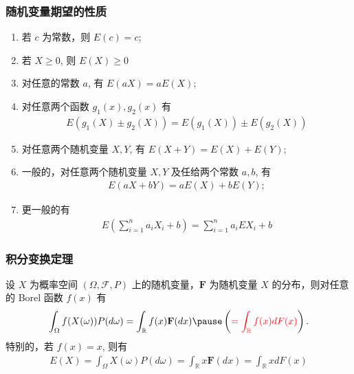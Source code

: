 	\begin{frame}
		\frametitle{随机变量期望的性质}
		\begin{enumerate}[<+-|alert@+>]
			\item 若 $c$ 为常数，则 $E (c)=c$;
			\item 若 $X\ge 0$, 则 $E (X)\ge 0$
			\item 对任意的常数 $a$, 有 $E (aX)=aE (X)$;
			\item 对任意两个函数 $g_1 (x),g_2 (x)$ 有
			\begin{eqnarray*}
				E(g_1(X)\pm g_2(X))=E(g_1(X))\pm E(g_2(X))
			\end{eqnarray*}
			\item 对任意两个随机变量 $X,Y$, 有 $E (X+Y)=E (X)+E (Y)$;
			\item 一般的，对任意两个随机变量 $X,Y$ 及任给两个常数 $a,b$, 有
			\begin{eqnarray*}
				E(aX+bY)=aE(X)+bE(Y);
			\end{eqnarray*}
			\item 更一般的有
			\begin{eqnarray*}
				E(\sum_{i=1}^na_iX_i+b)=\sum_{i=1}^na_iEX_i+b
			\end{eqnarray*}



		\end{enumerate}
	\end{frame}
	\begin{frame}
		\frametitle{积分变换定理}
		\begin{thm}
			设 $X$ 为概率空间 $(\Omega,\mathcal{F}, P)$ 上的随机变量，$\mathbf{F}$ 为随机变量 $X$ 的分布，则对任意的 Borel 函数 $f (x)$ 有
			\begin{eqnarray*}
				\int_\Omega f(X(\omega))P(d\omega)= \int_{\mathbb{R}}f(x)\mathbf{F}(dx) \pause \left(\textcolor{red}{= \int_{\mathbb{R}}f(x)dF(x)}\right).
			\end{eqnarray*}
			特别的，若 $f (x)=x$, 则有
			\begin{eqnarray*}
				E(X)=\int_\Omega X(\omega)P(d\omega)=\int_{\mathbb{R}}x \mathbf{F}(dx)=\int_{\mathbb{R}} xdF(x)
			\end{eqnarray*}

		\end{thm}
	\end{frame}


